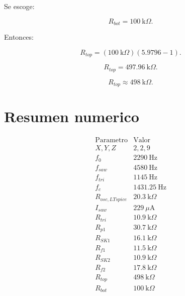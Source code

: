 \documentclass[11pt,letterpaper]{article}
\begin{document}
Se escoge:

\[
R_{bot}=100~\text{k}\Omega.
\]

Entonces:

\[
R_{top}=(100~\text{k}\Omega)(5.9796-1).
\]

\[
R_{top}=497.96~\text{k}\Omega.
\]

\[
\boxed{R_{top}\approx 498~\text{k}\Omega}.
\]

\section{Resumen numerico}

\[
\begin{array}{c|c}
\text{Parametro} & \text{Valor} \\
\hline
X,Y,Z & 2,2,9\\
f_0 & 2290~\text{Hz}\\
f_{saw} & 4580~\text{Hz}\\
f_{tri} & 1145~\text{Hz}\\
f_c & 1431.25~\text{Hz}\\
R_{osc,LTspice} & 20.3~\text{k}\Omega\\
I_{saw} & 229~\mu\text{A}\\
R_{tri} & 10.9~\text{k}\Omega\\
R_{p1} & 30.7~\text{k}\Omega\\
R_{SK1} & 16.1~\text{k}\Omega\\
R_{f1} & 11.5~\text{k}\Omega\\
R_{SK2} & 10.9~\text{k}\Omega\\
R_{f2} & 17.8~\text{k}\Omega\\
R_{top} & 498~\text{k}\Omega\\
R_{bot} & 100~\text{k}\Omega
\end{array}
\]
\end{document}
